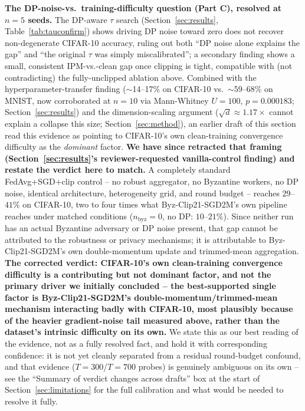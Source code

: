 \documentclass{article}
\begin{document}
\textbf{The DP-noise-vs.\ training-difficulty question (Part C), resolved at
$n{=}5$ seeds.} The DP-aware $\tau$ search (Section~\ref{sec:results},
Table~\ref{tab:tauconfirm}) shows driving DP noise toward zero does not
recover non-degenerate CIFAR-10 accuracy, ruling out both ``DP noise alone
explains the gap'' and ``the original $\tau$ was simply miscalibrated''; a
secondary finding shows a small, consistent IPM-vs.-clean gap once clipping is
tight, compatible with (not contradicting) the fully-unclipped ablation above.
Combined with the hyperparameter-transfer finding ($\sim$14--17\% on CIFAR-10
vs.\ $\sim$59--68\% on MNIST, now corroborated at $n{=}10$ via Mann-Whitney
$U{=}100$, $p{=}0.000183$; Section~\ref{sec:results}) and the dimension-scaling
argument ($\sqrt{d}\approx1.17\times$ cannot explain a collapse this size;
Section~\ref{sec:method}), an earlier draft of this section read this evidence
as pointing to CIFAR-10's own clean-training convergence difficulty as the
\emph{dominant} factor. \textbf{We have since retracted that framing
(Section~\ref{sec:results}'s reviewer-requested vanilla-control finding)
and restate the verdict here to match.} A completely standard FedAvg+SGD+clip
control -- no robust aggregator, no Byzantine workers, no DP noise, identical
architecture, heterogeneity grid, and round budget -- reaches $29$--$41\%$ on
CIFAR-10, two to four times what Byz-Clip21-SGD2M's own pipeline reaches under
matched conditions ($n_{\text{byz}}{=}0$, no DP: $10$--$21\%$). Since neither
run has an actual Byzantine adversary or DP noise present, that gap cannot be
attributed to the robustness or privacy mechanisms; it is attributable to
Byz-Clip21-SGD2M's own double-momentum update and trimmed-mean aggregation.
\textbf{The corrected verdict: CIFAR-10's own clean-training convergence
difficulty is a contributing but not dominant factor, and not the primary
driver we initially concluded -- the best-supported single factor is
Byz-Clip21-SGD2M's double-momentum/trimmed-mean mechanism interacting badly
with CIFAR-10, most plausibly because of the heavier gradient-noise tail
measured above, rather than the dataset's intrinsic difficulty on its own.}
We state this as our best reading of the evidence, not as a fully resolved
fact, and hold it with corresponding confidence: it is not yet cleanly
separated from a residual round-budget confound, and that evidence
($T{=}300$/$T{=}700$ probes) is genuinely ambiguous on its own -- see the
``Summary of verdict changes across drafts'' box at the start of
Section~\ref{sec:limitations} for the full calibration and what would be
needed to resolve it fully.
\end{document}
